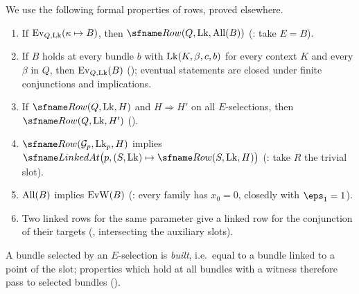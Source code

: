We use the following formal properties of rows, proved elsewhere.
\begin{enumerate}[label=(R\arabic*)]
\item\label{pf:open0:R1} If $\mathrm{Ev}_{Q,\mathrm{Lk}}(\kappa\mapsto B)$, then $\openzeroRow(Q,\openzeroLk,\openzeroAll(B))$
(: take $E=B$).
\item\label{pf:open0:R2} If $B$ holds at every bundle $b$ with $\mathrm{Lk}(K,\beta,c,b)$ for every context $K$ and
every $\beta$ in $Q$, then $\mathrm{Ev}_{Q,\mathrm{Lk}}(B)$ (); eventual statements
are closed under finite conjunctions and implications.
\item\label{pf:open0:R3} If $\openzeroRow(Q,\openzeroLk,H)$ and $H\Rightarrow H'$ on all $E$-selections, then
$\openzeroRow(Q,\openzeroLk,H')$ ().
\item\label{pf:open0:R4} $\openzeroRow(\openzeroGood_p,\openzeroLk_p,H)$ implies
$\openzeroLinked\bigl(p,(S,\openzeroLk)\mapsto\openzeroRow(S,\openzeroLk,H)\bigr)$
(: take $R$ the trivial slot).
\item\label{pf:open0:R5} $\mathrm{All}(B)$ implies $\mathrm{EvW}(B)$ (:
every family has $x_0=0$, closedly with $\eps_1=1$).
\item\label{pf:open0:R6} Two linked rows for the same parameter give a linked row for the conjunction of their
targets (, intersecting the auxiliary slots).
\end{enumerate}
A bundle selected by an $E$-selection is \emph{built}, i.e.\ equal to a bundle linked to a point of the slot; properties
which hold at all bundles with a witness therefore pass to selected bundles ().

